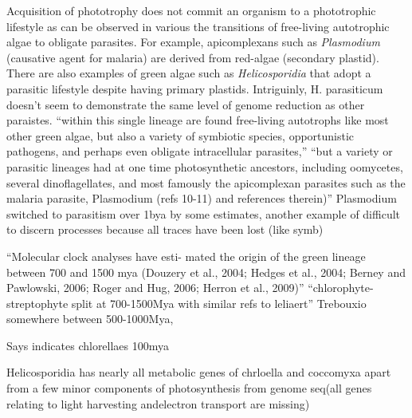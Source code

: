 




Acquisition of phototrophy does not commit an organism to a phototrophic lifestyle
as can be observed in various the transitions of free-living autotrophic algae 
to obligate parasites.  For example, apicomplexans such as \textit{Plasmodium} 
(causative agent for malaria) are derived from red-algae (secondary plastid).
There are also examples of green algae such as \textit{Helicosporidia} that 
adopt a parasitic lifestyle despite having primary plastids. 
Intriguinly, H. parasiticum doesn't seem to demonstrate the same level of
genome reduction as other paraistes.\citep{Pombert2014}
``within this single lineage are found free-living autotrophs like most
other green algae, but also a variety of symbiotic species,
opportunistic pathogens, and perhaps even obligate intracellular
parasites,''
``but a variety or parasitic lineages
had at one time photosynthetic ancestors, including oomycetes,
several dinoflagellates, and most famously the apicomplexan
parasites such as the malaria parasite, Plasmodium (refs 10-11)
and references therein)''
\citep{Pombert2014}
Plasmodium switched to parasitism over 1bya by some estimates, another example
of difficult to discern processes because all traces have been lost (like symb)



``Molecular clock analyses have esti- mated the origin of the green lineage between 700 and 1500 mya (Douzery et al., 2004; Hedges et al., 2004; Berney and Pawlowski, 2006; Roger and Hug, 2006; Herron et al., 2009)''
\citep{Leliaert2012}
``chlorophyte-streptophyte split at 700-1500Mya with similar refs to leliaert'' \citep{DeWever2009}
Trebouxio somewhere between 500-1000Mya, \citep{DeWever2009}



Says \citep{DeWever2009} indicates chlorellaes 100mya \citep{Pombert2014}

Helicosporidia has nearly all metabolic genes of chrloella and coccomyxa apart from
a few minor components of photosynthesis \citep{Pombert2014} from genome seq(all genes relating to light harvesting andelectron transport are missing)




